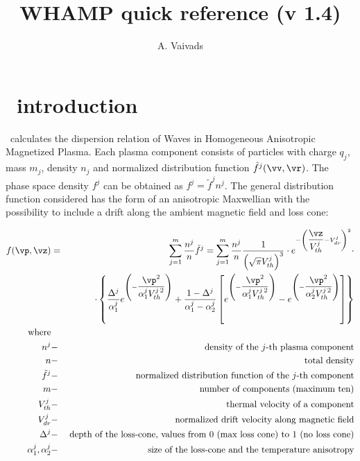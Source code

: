 \documentclass[a4,10pt]{article}
\begin{document}
\title{WHAMP quick reference (v 1.4)}
\author{A. Vaivads}
\maketitle

\section{\WHAMP\ introduction }

\WHAMP\ calculates the dispersion relation of Waves in Homogeneous Anisotropic Magnetized Plasma. Each plasma component consists of particles with charge $q_{j}$, mass $m_{j}$, density $n_{j}$ and  normalized distribution function $\tilde{f}^{j}(\vv,\vr)$. The phase space density $f^{j}$ can be obtained as $f^j=\tilde{f}^j n^j$.
The general distribution function considered has the form of an anisotropic Maxwellian with the possibility to include a drift along the ambient magnetic field and loss cone: 

\begin{eqnarray*}
f(\vp,\vz) & = &\sum_{j=1}^{m} \frac{n^{j}}{n} \tilde{f}^{j} =
         \sum_{j=1}^{m} \frac{n^{j}}{n}\frac{1}{\textstyle \left(\sqrt{\pi}V_{th}^{j}\right)^{3}}\cdot
           e^{-\left(\dfrac{\vz}{V_{th}^{j}}-V_{dr}^{j}\right)^2}\cdot\\
                       &   & \cdot\left\{\frac{\Delta^{j}}{\alpha_{1}^{j}}
                       e^{\left(-\dfrac{\vp^2}{\alpha_{1}^{j}V_{th}^{j\,2}}\right)}
                             +\frac{1-\Delta^{j}}{\alpha^{j}_{1}-\alpha_{2}^{j}}
                   \left[e^{\left(-\dfrac{\vp^2}{\alpha^{j}_{1}V_{th}^{j\,2}}\right)}
                  -e^{\left(-\dfrac{\vp^2}{\alpha^{j}_{2}V_{th}^{j\,2}}\right)}
                                \right]\right\}\\
\mbox{where}\\
        n^{j} & - & \mbox{density of the $j$-th plasma component}\\
            n & - & \mbox{total density}\\
 \tilde{f}^{j}& - & \mbox{normalized distribution function of the $j$-th component}\\
            m & - & \mbox{number of components (maximum ten)}\\
   V_{th}^{j} & - & \mbox{thermal velocity of a component}\\
   V_{dr}^{j} & - & \mbox{normalized drift velocity along magnetic field}\\
   \Delta^{j} & - & \mbox{depth of the loss-cone, values from 0 (max loss cone) to 1 (no loss cone)}\\
\alpha^{j}_{1},\alpha^{j}_{2} & - & \mbox{ size of the loss-cone and the temperature anisotropy}
\end{eqnarray*}
\end{document}
